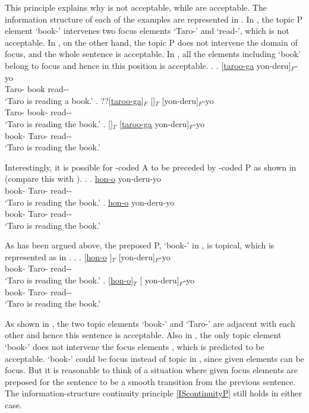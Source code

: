This principle explains why \LLast[b] is not acceptable,
while \LLast[a,c] are acceptable.
The information structure of each of the examples \LLast are represented in \Next.
In \Next[b],
the topic P element  `book-' intervenes two focus elements  `Taro-' and  `read-', which is not acceptable.
In \Next[c], on the other hand,
the topic P does not intervene the domain of focus,
and the whole sentence is acceptable.
In \Next[a],
all the elements including  `book' belong to focus
and hence  in this position is acceptable.
%
\ex. \ag. [\ul{taroo-ga}  yon-deru]$_{F}$-yo \\
		Taro- book read-- \\
		`Taro is reading a book.'
	\bg. ??[\ul{taroo-ga}]$_{F}$ []$_{T}$ [yon-deru]$_{F}$-yo \\
		Taro- book- read-- \\
		`Taro is reading the book.'
	\bg. []$_{T}$ [\ul{taroo-ga} yon-deru]$_{F}$-yo \\
		book- Taro- read-- \\
		`Taro is reading the book.'

Interestingly,
it is possible for -coded A to be preceded by -coded P as shown in \Next[a] (compare this with \Next[b]).
%
\ex.
\ag. \ul{hon-o}   yon-deru-yo \\
		book- Taro- read-- \\
		`Taro is reading the book.'
\bg. \ul{hon-o}  yon-deru-yo \\
		book- Taro- read-- \\
		`Taro is reading the book.'

As has been argued above,
the preposed P,  `book-' in \Last,
is topical, which is represented as in \Next.
%
\ex.
\ag. [\ul{hon-o} ]$_{T}$  [yon-deru]$_{F}$-yo \\
		book- Taro- read-- \\
		`Taro is reading the book.'
\bg. [\ul{hon-o}]$_{T}$ [ yon-deru]$_{F}$-yo \\
		book- Taro- read-- \\
		`Taro is reading the book.'

As shown in \Last[a],
the two topic elements  `book-' and  `Taro-' are adjacent with each other and hence this sentence is acceptable.
Also in \Last[b],
the only topic element  `book-' does not intervene the focus elements , which is predicted to be acceptable.
 `book-' could be focus instead of topic in \LLast[b], since given elements can be focus.
But it is reasonable to think of a situation where given focus elements are preposed
for the sentence to be a smooth transition from the previous sentence.
The information-structure continuity principle \ref{IScontinuityP} still holds in either case.

